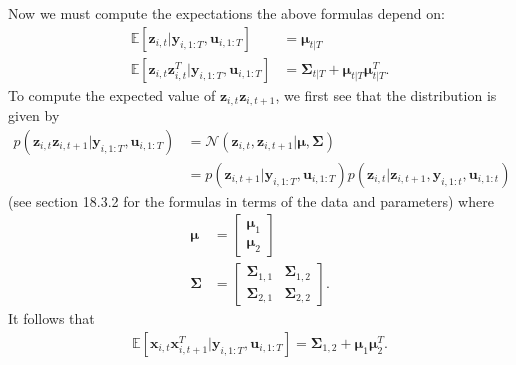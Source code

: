 \documentclass[a4paper,11pt]{article}
\begin{document}
Now we must compute the expectations the above formulas depend on:
\begin{align*}
\mathbb{E}\left[\mathbf{z}_{i,t}|\mathbf{y}_{i,1:T}, \mathbf{u}_{i,1:T}\right]
&= \boldsymbol{\mu}_{t|T} \\
\mathbb{E}\left[
  \mathbf{z}_{i,t} \mathbf{z}_{i,t}^T
  |\mathbf{y}_{i,1:T}, \mathbf{u}_{i,1:T}
\right] &= \boldsymbol{\Sigma}_{t|T} + \boldsymbol{\mu}_{t|T}\boldsymbol{\mu}_{t|T}^T.
\end{align*}
To compute the expected value of $\mathbf{z}_{i,t} \mathbf{z}_{i,t+1}$, we first see that
the distribution is given by
\begin{align*}
p(\mathbf{z}_{i,t} \mathbf{z}_{i,t+1}| \mathbf{y}_{i,1:T}, \mathbf{u}_{i,1:T}) &=
\mathcal{N}(\mathbf{z}_{i,t}, \mathbf{z}_{i,t+1}| \boldsymbol{\mu}, \boldsymbol{\Sigma})\\
&= p(\mathbf{z}_{i,t+1}|\mathbf{y}_{i,1:T}, \mathbf{u}_{i,1:T})
p(\mathbf{z}_{i,t}|\mathbf{z}_{i,t+1},\mathbf{y}_{i,1:t}, \mathbf{u}_{i,1:t} )
\end{align*}
(see section 18.3.2 for the formulas in terms of the data and parameters) where
\begin{align*}
  \boldsymbol{\mu} &= \begin{bmatrix}
  \boldsymbol{\mu}_1 \\ \boldsymbol{\mu}_2
\end{bmatrix} \\
\boldsymbol{\Sigma} &= \begin{bmatrix}
  \boldsymbol{\Sigma}_{1,1} & \boldsymbol{\Sigma}_{1,2} \\
  \boldsymbol{\Sigma}_{2,1} & \boldsymbol{\Sigma}_{2,2}
\end{bmatrix}.
\end{align*}
It follows that
\begin{align*}
\mathbb{E}\left[
  \mathbf{x}_{i,t} \mathbf{x}_{i,t+1}^T| \mathbf{y}_{i,1:T}, \mathbf{u}_{i,1:T}
\right] = \boldsymbol{\Sigma}_{1,2} + \boldsymbol{\mu}_1 \boldsymbol{\mu}_2^T.
\end{align*}
\end{document}
